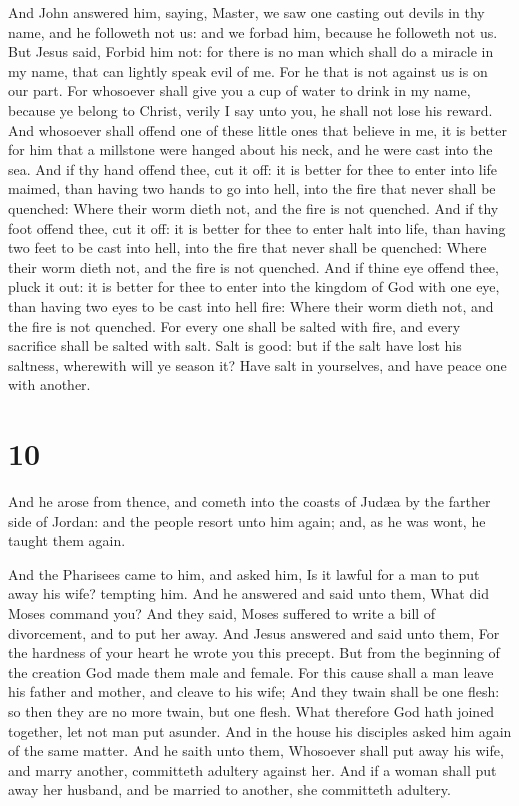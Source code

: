  And John answered him, saying, Master, we saw one
casting out devils in thy name, and he followeth not us: and we forbad
him, because he followeth not us.  But Jesus said, Forbid
him not: for there is no man which shall do a miracle in my name, that
can lightly speak evil of me.  For he that is not against
us is on our part.  For whosoever shall give you a cup of
water to drink in my name, because ye belong to Christ, verily I say
unto you, he shall not lose his reward.  And whosoever
shall offend one of these little ones that believe in me, it is better
for him that a millstone were hanged about his neck, and he were cast
into the sea.  And if thy hand offend thee, cut it off: it
is better for thee to enter into life maimed, than having two hands to
go into hell, into the fire that never shall be quenched: 
Where their worm dieth not, and the fire is not quenched. 
And if thy foot offend thee, cut it off: it is better for thee to enter
halt into life, than having two feet to be cast into hell, into the fire
that never shall be quenched:  Where their worm dieth not,
and the fire is not quenched.  And if thine eye offend
thee, pluck it out: it is better for thee to enter into the kingdom of
God with one eye, than having two eyes to be cast into hell fire:
 Where their worm dieth not, and the fire is not quenched.
 For every one shall be salted with fire, and every
sacrifice shall be salted with salt.  Salt is good: but if
the salt have lost his saltness, wherewith will ye season it? Have salt
in yourselves, and have peace one with another.

\hypertarget{section-9}{%
\section{10}\label{section-9}}

 And he arose from thence, and cometh into the coasts of
Judæa by the farther side of Jordan: and the people resort unto him
again; and, as he was wont, he taught them again.

 And the Pharisees came to him, and asked him, Is it
lawful for a man to put away his wife? tempting him.  And he
answered and said unto them, What did Moses command you? 
And they said, Moses suffered to write a bill of divorcement, and to put
her away.  And Jesus answered and said unto them, For the
hardness of your heart he wrote you this precept.  But from
the beginning of the creation God made them male and female.
 For this cause shall a man leave his father and mother, and
cleave to his wife;  And they twain shall be one flesh: so
then they are no more twain, but one flesh.  What therefore
God hath joined together, let not man put asunder.  And in
the house his disciples asked him again of the same matter.
 And he saith unto them, Whosoever shall put away his wife,
and marry another, committeth adultery against her.  And if
a woman shall put away her husband, and be married to another, she
committeth adultery.

